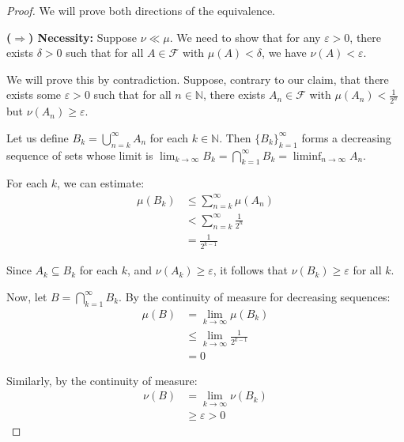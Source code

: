                         \begin{proof}
                        We will prove both directions of the equivalence.
                        
                        \textbf{($\Rightarrow$) Necessity:} Suppose $\nu \ll \mu$. We need to show that for any $\varepsilon > 0$, there exists $\delta > 0$ such that for all $A \in \mathcal{F}$ with $\mu(A) < \delta$, we have $\nu(A) < \varepsilon$.
                        
                        We will prove this by contradiction. Suppose, contrary to our claim, that there exists some $\varepsilon > 0$ such that for all $n \in \mathbb{N}$, there exists $A_n \in \mathcal{F}$ with $\mu(A_n) < \frac{1}{2^n}$ but $\nu(A_n) \geq \varepsilon$.
                        
                        Let us define $B_k = \bigcup_{n=k}^{\infty} A_n$ for each $k \in \mathbb{N}$. Then $\{B_k\}_{k=1}^{\infty}$ forms a decreasing sequence of sets whose limit is $\lim_{k\to\infty} B_k = \bigcap_{k=1}^{\infty} B_k = \liminf_{n\to\infty} A_n$.
                        
                        For each $k$, we can estimate:
                        \begin{align*}
                        \mu(B_k) &\leq \sum_{n=k}^{\infty} \mu(A_n) \\
                        &< \sum_{n=k}^{\infty} \frac{1}{2^n} \\
                        &= \frac{1}{2^{k-1}}
                        \end{align*}
                        
                        Since $A_k \subseteq B_k$ for each $k$, and $\nu(A_k) \geq \varepsilon$, it follows that $\nu(B_k) \geq \varepsilon$ for all $k$.
                        
                        Now, let $B = \bigcap_{k=1}^{\infty} B_k$. By the continuity of measure for decreasing sequences:
                        \begin{align*}
                        \mu(B) &= \lim_{k\to\infty} \mu(B_k) \\
                        &\leq \lim_{k\to\infty} \frac{1}{2^{k-1}} \\
                        &= 0
                        \end{align*}
                        
                        Similarly, by the continuity of measure:
                        \begin{align*}
                        \nu(B) &= \lim_{k\to\infty} \nu(B_k) \\
                        &\geq \varepsilon > 0
                        \end{align*}
                        

\end{proof}
